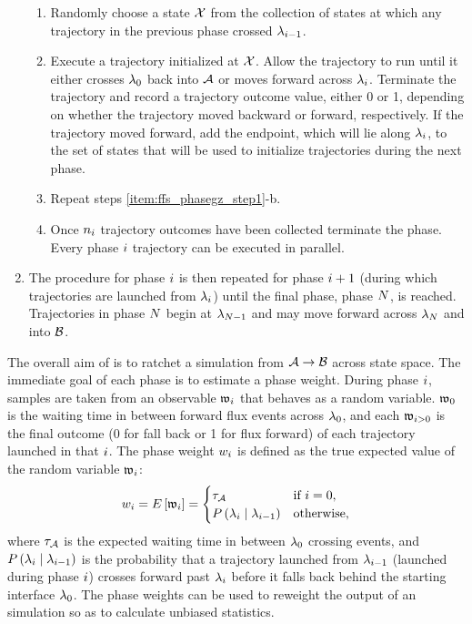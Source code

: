 \begin{enumerate}
        \begin{enumerate}
            \item\label{item:ffs_phasegz_step1} Randomly choose a state $\mathcal{X}$ from the collection of states at which any trajectory in the previous phase crossed ${\lambda}_{i - 1}$.
            \item\label{item:ffs_phasegz_step2} Execute a  trajectory initialized at $\mathcal{X}$. Allow the trajectory to run until it either crosses ${\lambda}_{0}$ back into $\mathcal{A}$ or moves forward across ${\lambda}_{i}$. Terminate the trajectory and record a trajectory outcome value, either 0 or 1, depending on whether the trajectory moved backward or forward, respectively. If the trajectory moved forward, add the endpoint, which will lie along ${\lambda}_{i}$, to the set of states that will be used to initialize trajectories during the next phase.
            \item Repeat steps \ref{item:ffs_phasegz_step1}-b.
            \item Once $n_{i}$ trajectory outcomes have been collected terminate the phase. Every phase $i$ trajectory can be executed in parallel.
        \end{enumerate}
    \item The procedure for  phase $i$ is then repeated for phase $i + 1$ (during which trajectories are launched from ${\lambda}_{i}$) until the final phase, phase $N$, is reached. Trajectories in phase $N$ begin at ${\lambda}_{N - 1}$ and may move forward across ${\lambda}_{N}$ and into $\mathcal{B}$.
\end{enumerate}

The overall aim of  is to ratchet a simulation from $\mathcal{A} \rightarrow \mathcal{B}$ across state space. The immediate goal of each phase is to estimate a phase weight. During phase $i$, samples are taken from an observable $\mathfrak{w}_{i}$ that behaves as a random variable. $\mathfrak{w}_{0}$ is the waiting time in between forward flux events across ${\lambda}_{0}$, and each $\mathfrak{w}_{i > 0}$ is the final outcome (0 for fall back or 1 for flux forward) of each trajectory launched in that $i$. The phase weight $w_{i}$ is defined as the true expected value of the random variable $\mathfrak{w}_{i}$:
\begin{equation}
    \label{eq:pw_definition}
        w_{i} = E \left[ \mathfrak{w}_{i} \right] =
        \begin{cases}
            \tau_{\mathcal{A}} & \text{if}\ i=0, \\
            P\left(  {\lambda}_{i} \mid {\lambda}_{i - 1}  \right) & \text{otherwise,}
        \end{cases}
    \end{equation}
where $\tau_{\mathcal{A}}$ is the expected waiting time in between ${\lambda}_{0}$ crossing events, and $P\left(  {\lambda}_{i} \mid {\lambda}_{i - 1}  \right)$ is the probability that a trajectory launched from ${\lambda}_{i - 1}$ (\ie launched during phase $i$) crosses forward past ${\lambda}_{i}$ before it falls back behind the starting interface ${\lambda}_{0}$. The phase weights can be used to reweight the output of an  simulation so as to calculate unbiased statistics.

